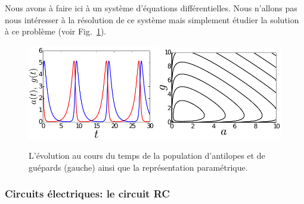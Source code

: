 \documentclass[a4paper,12pt]{book}
\begin{document}
Nous avons à faire ici à un système d'équations différentielles. Nous n'allons pas nous intéresser à la résolution 
de ce système mais simplement étudier la solution à ce problème (voir Fig.~\ref{fig_lk}). 
\begin{figure}
\includegraphics[width=0.5\textwidth]{figs/lv.pdf}\includegraphics[width=0.5\textwidth]{figs/lv_iso.pdf}
\caption{L'évolution au cours du temps de la population d'antilopes et de guépards (gauche) ainsi que la représentation paramétrique.}\label{fig_lk}
\end{figure}

\subsubsection{Circuits électriques: le circuit RC}
\end{document}
